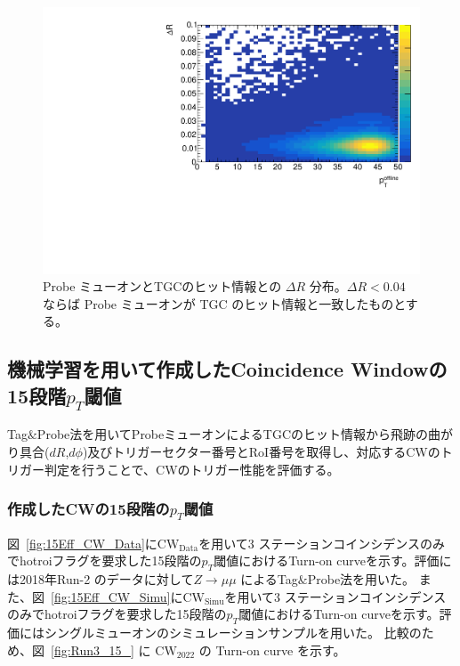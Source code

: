\begin{figure}[htb]
  \centering
  \includegraphics[clip, width=12cm]{fig/3/dR_probe_RoI.pdf}
  \caption{Probe ミューオンとTGCのヒット情報との $\Delta R$ 分布。$\Delta R < 0.04$ ならば Probe ミューオンが TGC のヒット情報と一致したものとする。}
  \label{fig:Probe_TGC}
\end{figure}



\subsection{機械学習を用いて作成したCoincidence Windowの15段階$p_{T}$閾値}
Tag$\&$Probe法を用いてProbeミューオンによるTGCのヒット情報から飛跡の曲がり具合($dR$,$d\phi$)及びトリガーセクター番号とRoI番号を取得し、対応するCWのトリガー判定を行うことで、CWのトリガー性能を評価する。
\subsubsection{作成したCWの15段階の$p_T$閾値}
図~\ref{fig:15Eff_CW_Data}に$\mathrm{CW_{Data}}$を用いて3 ステーションコインシデンスのみでhotroiフラグを要求した15段階の$p_T$閾値におけるTurn-on curveを示す。評価には2018年Run-2 のデータに対して$Z\rightarrow \mu\mu$ によるTag$\&$Probe法を用いた。
また、図~\ref{fig:15Eff_CW_Simu}に$\mathrm{CW_{Simu}}$を用いて3 ステーションコインシデンスのみでhotroiフラグを要求した15段階の$p_T$閾値におけるTurn-on curveを示す。評価にはシングルミューオンのシミュレーションサンプルを用いた。
比較のため、図~\ref{fig:Run3_15_} に $\mathrm{CW_{2022}}$ の Turn-on curve を示す。

